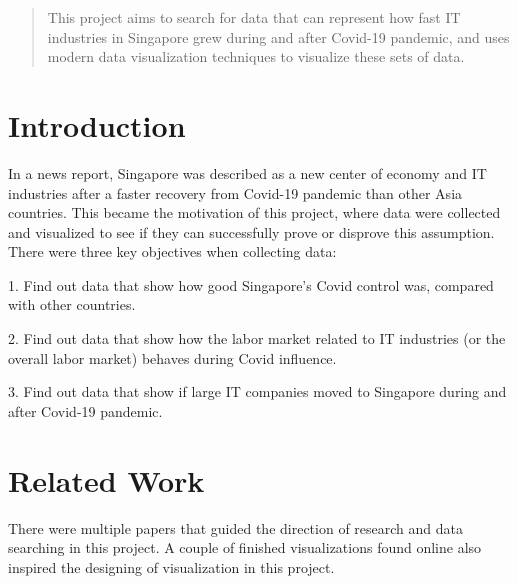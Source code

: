 \documentclass[conference]{IEEEtran}
\begin{document}
\maketitle

\begin{abstract}
This project aims to search for data that can represent how fast IT industries in Singapore grew during and after Covid-19 pandemic,  and uses modern data visualization techniques to visualize these sets of data.
\end{abstract}





%


\section{Introduction}
In a news report\cite{economist}, Singapore was described as a new center of economy and IT industries after a faster recovery from Covid-19 pandemic than other Asia countries. This became the motivation of this project, where data were collected and visualized to see if they can successfully prove or disprove this assumption. There were three key objectives when collecting data:

1. Find out data that show how good Singapore’s Covid control was, compared with other countries.

2. Find out data that show how the labor market related to IT industries (or the overall labor market) behaves during Covid influence.

3. Find out data that show if large IT companies moved to Singapore during and after Covid-19 pandemic.

\section{Related Work}
There were multiple papers that guided the direction of research and data searching in this project. A couple of finished visualizations found online also inspired the designing of visualization in this project.
\end{document}
